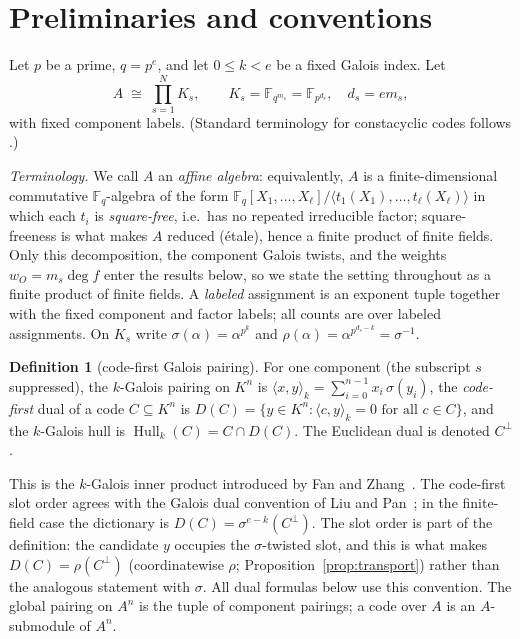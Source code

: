 \documentclass[10pt,journal,draftclsnofoot,onecolumn]{IEEEtran}
\theoremstyle{definition}
\newtheorem{definition}[theorem]{Definition}
\theoremstyle{remark}
\newcommand{\Fq}{\mathbb{F}_q}
\newcommand{\Hull}{\operatorname{Hull}}
\begin{document}
\section{Preliminaries and conventions}\label{sec:prelim}

Let \(p\) be a prime, \(q = p^e\), and let \(0 \le k < e\) be a fixed
Galois index. Let
\[
A \;\cong\; \prod_{s=1}^{N} K_s, \qquad
K_s = \mathbb{F}_{q^{m_s}} = \mathbb{F}_{p^{d_s}}, \quad d_s = e m_s,
\]
with fixed component labels. (Standard terminology for constacyclic codes
follows \cite{HP2003, MS1977}.)

\emph{Terminology.} We call \(A\) an \emph{affine algebra}: equivalently,
\(A\) is a finite-dimensional commutative \(\Fq\)-algebra of the form
\(\Fq[X_1,\dots,X_\ell]/\langle t_1(X_1),\dots,t_\ell(X_\ell)\rangle\)
in which each \(t_i\) is \emph{square-free}, i.e.\ has no repeated
irreducible factor; square-freeness is what makes \(A\) reduced
(\'etale), hence a finite product of finite fields. Only this
decomposition, the component Galois twists, and the weights
\(w_O = m_s \deg f\) enter the results below, so we state the setting
throughout as a finite product of finite fields. A \emph{labeled}
assignment is an exponent tuple together with the fixed component and
factor labels; all counts are over labeled assignments. On \(K_s\) write
\(\sigma(\alpha) = \alpha^{p^k}\) and
\(\rho(\alpha) = \alpha^{p^{d_s - k}} = \sigma^{-1}\).

\begin{definition}[code-first Galois pairing]
For one component (the subscript \(s\) suppressed), the \(k\)-Galois
pairing on \(K^n\) is
\(\langle x, y \rangle_k = \sum_{i=0}^{n-1} x_i \, \sigma(y_i)\),
the \emph{code-first} dual of a code \(C \subseteq K^n\) is
\(D(C) = \{ y \in K^n : \langle c, y \rangle_k = 0 \text{ for all } c \in C\}\),
and the \(k\)-Galois hull is \(\Hull_k(C) = C \cap D(C)\).
The Euclidean dual is denoted \(C^\perp\).
\end{definition}

This is the \(k\)-Galois inner product introduced by Fan and
Zhang~\cite{FZ2017}. The code-first slot order agrees with the Galois
dual convention of Liu and Pan~\cite{LP2020}; in the finite-field case
the dictionary is \(D(C) = \sigma^{e-k}(C^\perp)\). The slot order is part of the definition: the candidate \(y\) occupies
the \(\sigma\)-twisted slot, and this is what makes
\(D(C) = \rho(C^\perp)\) (coordinatewise \(\rho\);
Proposition~\ref{prop:transport}) rather than the analogous statement
with \(\sigma\). All dual formulas below use this convention. The global
pairing on \(A^n\) is the tuple of component pairings; a code over \(A\)
is an \(A\)-submodule of \(A^n\).
\end{document}
